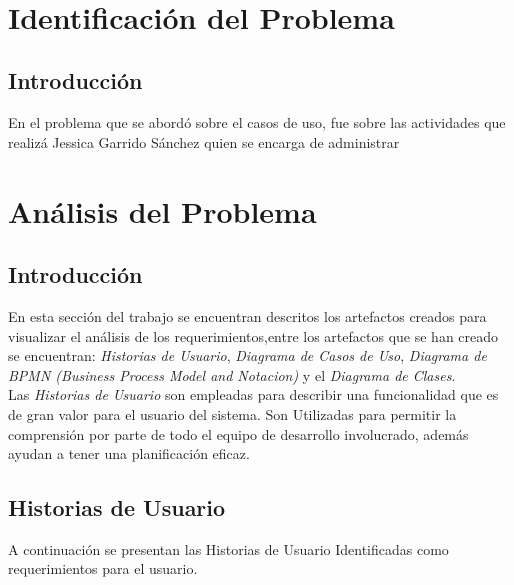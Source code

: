 \documentclass{report}
\makeatletter
\let\thedate\@date
\makeatother
\begin{document}
\begin{titlepage}
	{\large \thedate}\\[2 cm]
 
	\vfill
	
\end{titlepage}


\tableofcontents
\pagebreak

\chapter{Identificación del Problema}
    
    \section{Introducción}

En el problema que se abordó sobre el casos de uso, fue sobre las actividades que realizá Jessica Garrido Sánchez quien se encarga de administrar 

\chapter{Análisis del Problema}

    \section{Introducción}
    En esta sección del trabajo se encuentran descritos los artefactos creados para visualizar el análisis de los requerimientos,entre los artefactos que se han creado se encuentran: \emph{Historias de Usuario}, \emph{Diagrama de Casos de Uso}, \emph{Diagrama de BPMN (Business Process Model and Notacion)} y el \emph{Diagrama de Clases}.\\ 
    Las \emph{Historias de Usuario} son empleadas para describir una funcionalidad que es de gran valor para el usuario del sistema. Son Utilizadas para permitir la comprensión por parte de todo el equipo de desarrollo involucrado, además ayudan  a tener una planificación eficaz.\\
    
    
    \section{Historias de Usuario}
    A continuación se presentan las Historias de Usuario Identificadas como requerimientos para el usuario.
    
\end{document}
